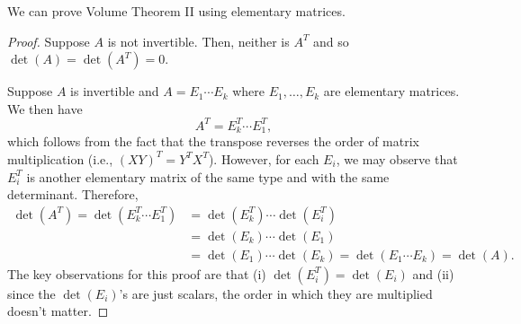 We can prove Volume Theorem II using elementary matrices.
\begin{proof}
	Suppose $A$ is not invertible. Then, neither is $A^T$ and so $\det(A)=\det(A^T)=0$.

	Suppose $A$ is invertible and $A=E_1\cdots E_k$ where $E_1,\ldots, E_k$ are elementary
	matrices. We then have
	\[
		A^T = E_k^T\cdots E_1^T,
	\]
	which follows from the fact that the transpose reverses the order of matrix multiplication
	(i.e., $(XY)^T=Y^TX^T$).
	However, for each $E_i$, we may observe that $E_i^T$ is another elementary matrix
	of the same type and with the same determinant. Therefore,
	\begin{align*}
		\det(A^T) = \det(E_k^T\cdots E_1^T)&=\det(E_k^T)\cdots \det(E_i^T)\\ 
		&=
		\det(E_k)\cdots \det(E_1)\\ &= \det(E_1)\cdots \det(E_k) = \det(E_1\cdots E_k)=\det(A).
	\end{align*}
	The key observations for this proof are that (i) $\det(E_i^T)=\det(E_i)$ and (ii) since the 
	$\det(E_i)$'s are just scalars, the order in which they are multiplied doesn't matter.
\end{proof}
